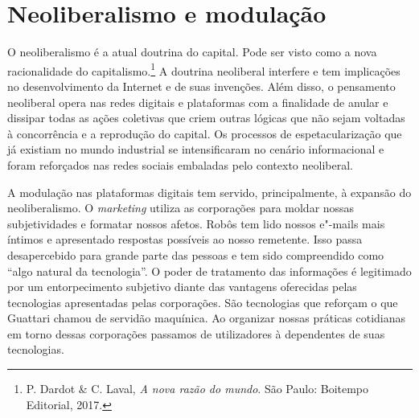 \section{Neoliberalismo e modulação}

O neoliberalismo é a atual doutrina do capital. Pode ser visto como a
nova racionalidade do capitalismo.\footnote{P. Dardot \& C. Laval, \textit{A nova razão do mundo}. São Paulo: Boitempo Editorial, 2017.} A doutrina
neoliberal interfere e tem implicações no desenvolvimento da Internet e
de suas invenções. Além disso, o pensamento neoliberal opera nas redes
digitais e plataformas com a finalidade de anular e dissipar todas as
ações coletivas que criem outras lógicas que não sejam voltadas à
concorrência e a reprodução do capital. Os processos de
espetacularização que já existiam no mundo industrial se intensificaram
no cenário informacional e foram reforçados nas redes sociais embaladas
pelo contexto neoliberal.

A modulação nas plataformas digitais tem servido, principalmente, à
expansão do neoliberalismo. O \textit{marketing} utiliza as corporações para
moldar nossas subjetividades e formatar nossos afetos. Robôs tem lido
nossos e"-mails mais íntimos e apresentado respostas possíveis ao nosso
remetente. Isso passa desapercebido para grande parte das pessoas e tem
sido compreendido como ``algo natural da tecnologia''. O poder de
tratamento das informações é legitimado por um entorpecimento subjetivo
diante das vantagens oferecidas pelas tecnologias apresentadas pelas
corporações. São tecnologias que reforçam o que Guattari chamou de
servidão maquínica. Ao organizar nossas práticas cotidianas em torno
dessas corporações passamos de utilizadores à dependentes de suas
tecnologias.



